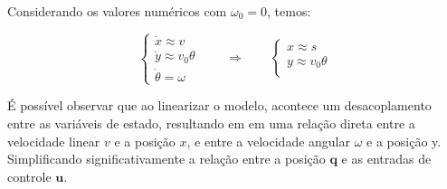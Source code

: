 Considerando os valores numéricos com $\omega_0 = 0$, temos:

\begin{equation}
\begin{cases}
\dot{x} \approx v \\
\dot{y} \approx v_0 \theta \\
\dot{\theta} = \omega
\end{cases}
\qquad
\Rightarrow
\qquad
\begin{cases}
x \approx s \\
y \approx v_0 \theta \\
\end{cases}
\end{equation}

É possível observar que ao linearizar o modelo, 
acontece um desacoplamento entre as variáveis de estado,
resultando em em uma relação direta entre a velocidade linear $v$ e a posição $x$,
e entre a velocidade angular $\omega$ e a posição y. Simplificando significativamente
 a relação entre a posição $\mathbf{q}$
e as entradas de controle $\mathbf{u}$.